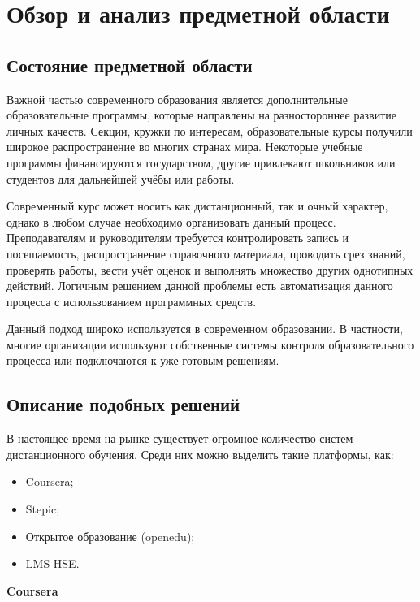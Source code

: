 \documentclass[a4paper,14pt]{article}
\begin{document}
\section{Обзор и анализ предметной области}


\subsection{Состояние предметной области}

Важной частью современного образования является дополнительные образовательные программы, которые направлены на разностороннее развитие личных качеств.
Секции, кружки по интересам, образовательные курсы получили широкое распространение во многих странах мира.
Некоторые учебные программы финансируются государством, другие привлекают школьников или студентов для дальнейшей учёбы или работы.

Современный курс может носить как дистанционный, так и очный характер, однако в любом случае необходимо организовать данный процесс.
Преподавателям и руководителям требуется контролировать запись и посещаемость, распространение справочного материала, проводить срез знаний, проверять работы, вести учёт оценок и выполнять множество других однотипных действий.
Логичным решением данной проблемы есть автоматизация данного процесса с использованием программных средств.

Данный подход широко используется в современном образовании. В частности, многие организации используют собственные системы контроля образовательного процесса или подключаются к уже готовым решениям.

\subsection{Описание подобных решений}

В настоящее время на рынке существует огромное количество систем дистанционного обучения. Среди них можно выделить такие платформы, как:
\begin{itemize}
	\item Coursera;
	\item Stepic;
	\item Открытое образование (openedu);
	\item LMS HSE.
\end{itemize}

\textbf{Coursera}
\end{document}
